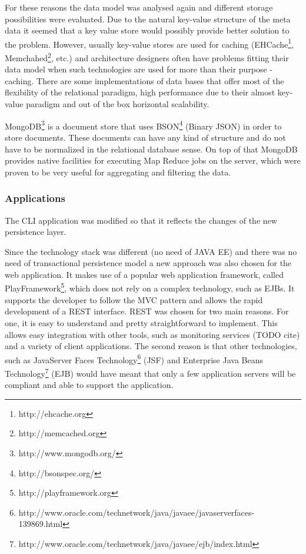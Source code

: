 For these reasons the data model was analysed again and different storage possibilities were evaluated. 
Due to the natural key-value structure of the meta data it seemed that a key value store would possibly provide better solution to the problem. However, usually key-value stores are used for caching (EHCache\footnote{http://ehcache.org}, Memchahed\footnote{http://memcached.org}, etc.) and architecture designers often have problems fitting their data model when such technologies are used for more than their purpose - caching. There are some implementations of data bases that offer most of the flexibility of the relational paradigm, high performance due to their almost key-value paradigm and out of the box horizontal scalability.

MongoDB\footnote{http://www.mongodb.org/} is a document store that uses BSON\footnote{http://bsonspec.org/} (Binary JSON) in order to store documents. These documents can have any kind of structure and do not have to be normalized in the relational database sense. On top of that MongoDB provides native facilities for executing Map Reduce \cite{Dean:2008:MSD:1327452.1327492} jobs on the server, which were proven to be very useful for aggregating and filtering the data.

\subsubsection{Applications}
The CLI application was modified so that it reflects the changes of the new persistence layer.

Since the technology stack was different (no need of JAVA EE) and there was no need of transactional persistence model a new approach was also chosen for the web application. It makes use of a popular web application framework, called PlayFramework\footnote{http://playframework.org}, which does not rely on a complex technology, such as EJBs. It supports the developer to follow the MVC pattern and allows the rapid development of a REST \cite{Fielding:2000:ASD:932295} interface. REST was chosen for two main reasons. For one, it is easy to understand and pretty straightforward to implement. This allows easy integration with other tools, such as monitoring services (TODO cite) and a variety of client applications. The second reason is that other technologies, such as JavaServer Faces Technology\footnote{http://www.oracle.com/technetwork/java/javaee/javaserverfaces-139869.html} (JSF) and Enterprise Java Beans Technology\footnote{http://www.oracle.com/technetwork/java/javaee/ejb/index.html} (EJB) would have meant that only a few application servers will be compliant and able to support the application.

